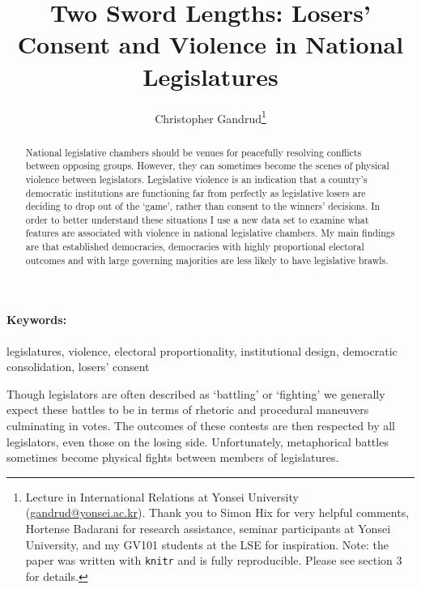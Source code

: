 \documentclass[a4paper]{article}\usepackage{graphicx, color}
\title{Two Sword Lengths: Losers' Consent and Violence in National Legislatures}
\author{Christopher Gandrud\thanks{Lecture in International Relations at Yonsei University (\href{mailto:gandrud@yonsei.ac.kr}{gandrud@yonsei.ac.kr}). Thank you to Simon Hix for very helpful comments, Hortense Badarani for research assistance, seminar participants at Yonsei University, and my GV101 students at the LSE for inspiration. Note: the paper was written with {\tt{knitr}} \citep{knitr2012} and is fully reproducible. Please see section 3 for details.
}}
\date{}
\begin{document}
\maketitle

\begin{abstract}
National legislative chambers should be venues for peacefully resolving conflicts between opposing groups. However, they can sometimes become the scenes of physical violence between legislators. Legislative violence is an indication that a country's democratic institutions are functioning far from perfectly as legislative losers are deciding to drop out of the `game', rather than consent to the winners' decisions. In order to better understand these situations I use a new data set to examine what features are associated with violence in national legislative chambers. My main findings are that established democracies, democracies with highly proportional electoral outcomes and with large governing majorities are less likely to have legislative brawls. 

\end{abstract}


\paragraph{Keywords:} legislatures, violence, electoral proportionality, institutional design, democratic consolidation, losers' consent

\vspace{0.3cm}


Though legislators are often described as `battling' or `fighting' we generally expect these battles to be in terms of rhetoric and procedural maneuvers culminating in votes. The outcomes of these contests are then respected by all legislators, even those on the losing side. Unfortunately, metaphorical battles sometimes become physical fights between members of legislatures. 
\end{document}
